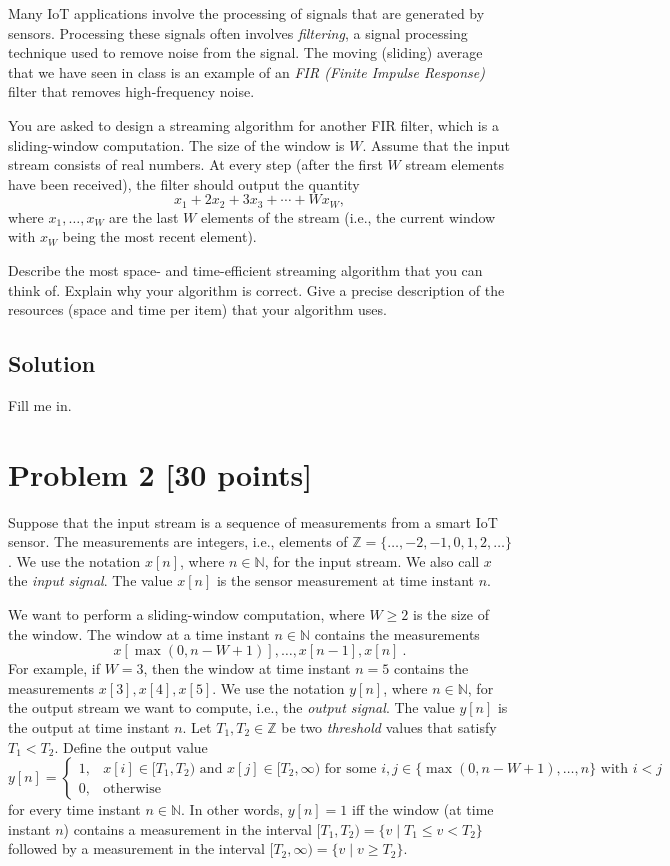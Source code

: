 \documentclass[11pt]{article}
\newcommand{\N}{\mathbb{N}}
\newcommand{\Z}{\mathbb{Z}}
\begin{document}
Many IoT applications involve the processing of signals that are generated by sensors. Processing these signals often involves \emph{filtering}, a signal processing technique used to remove noise from the signal. The moving (sliding) average that we have seen in class is an example of an \emph{FIR (Finite Impulse Response)} filter that removes high-frequency noise.

You are asked to design a streaming algorithm for another FIR filter, which is a sliding-window computation. The size of the window is $W$. Assume that the input stream consists of real numbers. At every step (after the first $W$ stream elements have been received), the filter should output the quantity
\[
  x_1 + 2 x_2 + 3 x_3 + \cdots + W x_W,
\]
where $x_1, \ldots, x_W$ are the last $W$ elements of the stream (i.e., the current window with $x_W$ being the most recent element).

Describe the most space- and time-efficient streaming algorithm that you can think of. Explain why your algorithm is correct. Give a precise description of the resources (space and time per item) that your algorithm uses.

\subsection*{Solution}

Fill me in.

\newpage
\section*{Problem 2 [30 points]}

Suppose that the input stream is a sequence of measurements from a smart IoT sensor. The measurements are integers, i.e., elements of $\Z = \{ \ldots, -2, -1, 0, 1, 2, \ldots \}$. We use the notation $x[n]$, where $n \in \N$, for the input stream. We also call $x$ the \emph{input signal}. The value $x[n]$ is the sensor measurement at time instant $n$.

We want to perform a sliding-window computation, where $W \geq 2$ is the size of the window. The window at a time instant $n \in \N$ contains the measurements
\[
  x[\max(0, n - W + 1)], \ldots, x[n-1], x[n]
  \ .
\]
For example, if $W = 3$, then the window at time instant $n = 5$ contains the measurements $x[3], x[4], x[5]$.
%
We use the notation $y[n]$, where $n \in \N$, for the output stream we want to compute, i.e., the \emph{output signal}. The value $y[n]$ is the output at time instant $n$. Let $T_1, T_2 \in \Z$ be two \emph{threshold} values that satisfy $T_1 < T_2$. Define the output value
\[
  y[n] = \begin{cases}
    1, &\text{$x[i] \in [T_1,T_2)$ and $x[j] \in [T_2,\infty)$ for some $i, j \in \{\max(0,n-W+1),\ldots,n\}$ with $i < j$}
    \\
    0, &\text{otherwise}
  \end{cases}
\]
for every time instant $n \in \N$. In other words, $y[n] = 1$ iff the window (at time instant $n$) contains a measurement in the interval $[T_1, T_2) = \{ v \mid T_1 \leq v < T_2 \}$ followed by a measurement in the interval $[T_2, \infty) = \{ v \mid v \geq T_2 \}$.
\end{document}
